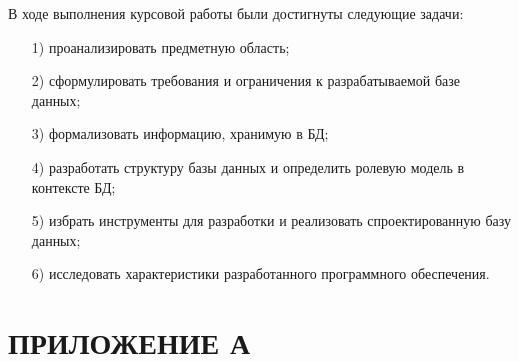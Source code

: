 \documentclass{bmstu}
\begin{document}
В ходе выполнения курсовой работы были достигнуты следующие задачи:
\begin{enumerate}
	\item[1)] проанализировать предметную область;
	\item[2)] сформулировать требования и ограничения к разрабатываемой базе данных;
	\item[3)] формализовать информацию, хранимую в БД;
	\item[4)] разработать структуру базы данных и определить ролевую модель в контексте БД;
	\item[5)] избрать инструменты для разработки и реализовать спроектированную базу данных;
	\item[6)] исследовать характеристики разработанного программного обеспечения.
\end{enumerate}

{\centering \printbibliography[title=СПИСОК ИСПОЛЬЗОВАННЫХ ИСТОЧНИКОВ,heading=bibintoc]}

{\centering \chapter*{ПРИЛОЖЕНИЕ А}}
\end{document}
